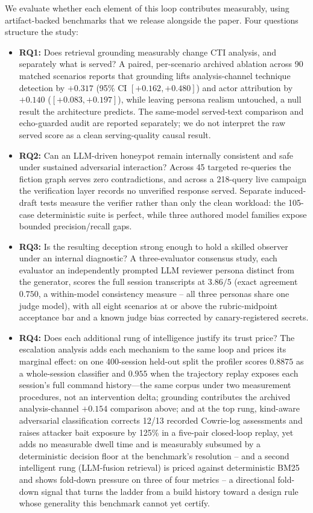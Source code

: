 We evaluate whether each element of this loop contributes measurably,
using
artifact-backed benchmarks that we release alongside the paper. Four
questions structure the study:
\begin{itemize}
\item \textbf{RQ1:} Does retrieval grounding measurably change CTI analysis,
and separately what is served? A paired, per-scenario archived ablation across
90 matched scenarios reports that grounding lifts analysis-channel technique detection by
$+0.317$ (95\% CI $[+0.162, +0.480]$) and actor attribution by $+0.140$
($[+0.083, +0.197]$), while leaving persona realism untouched, a null result
the architecture predicts. The same-model served-text comparison and
echo-guarded audit are reported separately; we do not interpret the raw served
score as a clean serving-quality causal result.
\item \textbf{RQ2:} Can an LLM-driven honeypot remain internally consistent
and safe under sustained adversarial interaction? Across 45 targeted
re-queries the fiction graph serves zero contradictions, and across a
218-query live campaign the verification layer records no unverified
response served. Separate induced-draft tests measure the verifier rather
than only the clean workload: the 105-case deterministic suite is perfect,
while three authored model families expose bounded precision/recall gaps.
\item \textbf{RQ3:} Is the resulting deception strong enough to hold a
skilled observer under an internal diagnostic? A three-evaluator consensus study, each evaluator an
independently prompted LLM reviewer persona distinct from the generator,
scores the full session transcripts at $3.86/5$ (exact agreement
$0.750$, a within-model consistency measure -- all three personas share
one judge model), with all eight scenarios at or above the rubric-midpoint
acceptance bar and
a known judge bias corrected by canary-registered secrets.
\item \textbf{RQ4:} Does each additional rung of intelligence justify its
trust price? The escalation analysis adds each mechanism
to the same
loop and prices its marginal effect: on one 400-session held-out split the
profiler scores $0.8875$ as a whole-session classifier and $0.955$ when the
trajectory replay exposes each session's full command history---the same
corpus under two measurement procedures, not an intervention delta;
grounding contributes the archived analysis-channel $+0.154$
comparison above; and at the top rung, kind-aware adversarial classification
corrects 12/13 recorded Cowrie-log assessments and raises attacker bait exposure by 125\% in a
five-pair closed-loop replay, yet adds no measurable dwell time and is
measurably subsumed by a deterministic decision floor at the benchmark's
resolution -- and a second intelligent rung (LLM-fusion retrieval) is
priced against deterministic BM25 and shows fold-down pressure on three
of four metrics -- a directional fold-down signal that turns the ladder
from a build history toward a design rule whose generality this
benchmark cannot yet certify.
\end{itemize}

